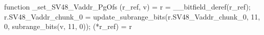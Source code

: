 function _set_SV48_Vaddr_PgOfs (r_ref, v) = {
    r = __bitfield_deref(r_ref);
    r.SV48_Vaddr_chunk_0 = update_subrange_bits(r.SV48_Vaddr_chunk_0, 11, 0, subrange_bits(v, 11, 0));
    (*r_ref) = r
}
